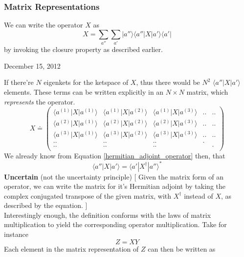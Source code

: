 \documentclass[12pt]{article}
\def\bra#1{\langle#1|}
\def\ket#1{|#1 \rangle}
\def\braket#1#2#3{\langle#1|#2|#3\rangle}
\def\ha#1{#1^\dagger}
\begin{document}
			\subsubsection{Matrix Representations}
				We can write the operator $X$ as 
				\begin{equation}
					X=\sum_{a''} \sum_{a'} \ket {a''} \bra {a''} X \ket {a'} \bra {a'}
				\end{equation}
				by invoking the closure property as described earlier.
			\begin{flushright} {\small December 15, 2012} \end{flushright}
				If there're $N$ eigenkets for the ketspace of $X$, thus there would be $N^2$ $\bra{a''} X \ket {a'}$ elements. These terms can be written explicitly in an $N\times N$ matrix, which \emph{represents} the operator.
				\begin{equation}
				X \doteq
				\left(
				\begin{array}{ccccc}
					\braket{a^{(1)}}X{a^{(1)}} & \braket{a^{(1)}}X{a^{(2)}} & \braket{a^{(1)}}X{a^{(3)}}  & .. & ..\\
					\braket{a^{(2)}}X{a^{(1)}} & \braket{a^{(2)}}X{a^{(2)}} & \braket{a^{(2)}}X{a^{(3)}}  & .. & ..\\
					\braket{a^{(3)}}X{a^{(1)}} & \braket{a^{(3)}}X{a^{(2)}} & \braket{a^{(3)}}X{a^{(3)}}  & .. & ..\\
					.. & .. & .. & . \\
					.. & .. & .. &  & . \\
				\end{array}
				\right)
				\label{operator_matrix_representation}
				\end{equation}
				We already know from Equation \ref{hermitian_adjoint_operator} then, that 
				\begin{equation}
					\braket{a''}X{a'} = \braket{a'}{\ha X}{a''}^*
				\end{equation}
				{\bf Uncertain} (not the uncertainty principle) [ Given the matrix form of an operator, we can write the matrix for it's Hermitian adjoint by taking the complex conjugated transpose of the given matrix, with $\ha X$ instead of $X$, as described by the equation. ] \\
				Interestingly enough, the definition conforms with the laws of matrix multiplication to yield the corresponding operator multiplication. Take for instance
				\begin{equation}
					Z = XY
				\end{equation}
				Each element in the matrix representation of $Z$ can then be written as
\end{document}
